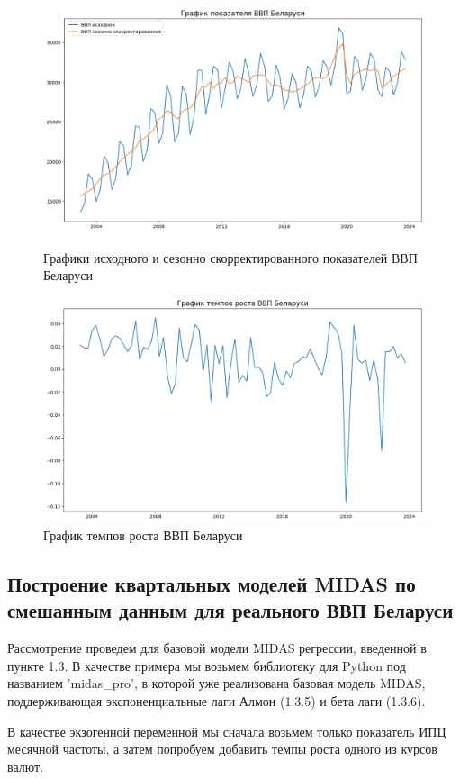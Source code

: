 \documentclass[a4paper, 12pt]{extarticle}
\numberwithin{equation}{subsection}
\begin{document}
	\begin{figure}[h]
		\centering
		\includegraphics[scale=0.5]{images/img04}
		\caption{Графики исходного и сезонно скорректированного показателей ВВП Беларуси}
		\label{fig:img04}
		\centering
		\includegraphics[scale=0.5]{images/img05}
		\caption{График темпов роста ВВП Беларуси}
		\label{fig:img05}
	\end{figure}
	
	
	\subsection{Построение квартальных моделей MIDAS по смешанным данным для реального ВВП Беларуси}
	
	Рассмотрение проведем для базовой модели MIDAS регрессии, введенной в пункте 1.3. В качестве примера мы возьмем библиотеку для Python под названием 'midas\_pro', в которой уже реализована базовая модель MIDAS, поддерживающая экспоненциальные лаги Алмон (1.3.5) и бета лаги (1.3.6).
	
	В качестве экзогенной переменной мы сначала возьмем только показатель ИПЦ месячной частоты, а затем попробуем добавить темпы роста одного из курсов валют.
	
\end{document}
